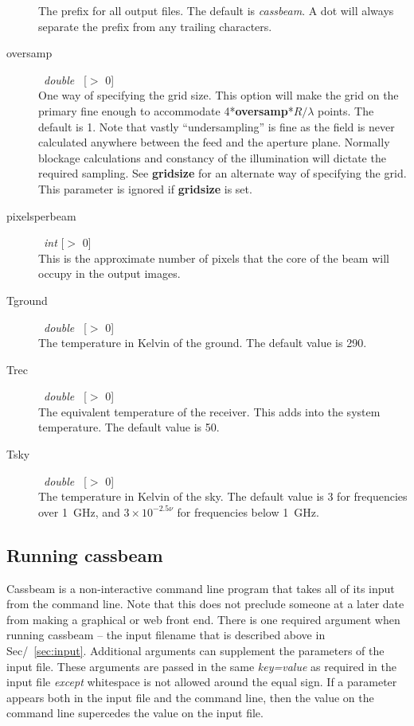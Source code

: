 \documentclass{article}
\begin{document}
\begin{description}
The prefix for all output files.  The default is {\it cassbeam}.  A dot
will always separate the prefix from any trailing characters.
\item[oversamp] \ {\it double} \ [$>$ 0] \\
One way of specifying the grid size.  This option will make the grid on the
primary fine enough to accommodate 4*{\bf oversamp}*$R/\lambda$ points.  The
default is 1.  Note that vastly ``undersampling'' is fine as the field is
never calculated anywhere between the feed and the aperture plane.  Normally
blockage calculations and constancy of the illumination will dictate the
required sampling.  See {\bf gridsize} for an alternate way of specifying
the grid.  This parameter is ignored if {\bf gridsize} is set.
\item[pixelsperbeam] \ {\it int} [$>$ 0] \\
This is the approximate number of pixels that the core of the beam will
occupy in the output images.
\item[Tground] \ {\it double} \ [$>$ 0] \\
The temperature in Kelvin of the ground.  The default value is 290.
\item[Trec] \ {\it double} \ [$>$ 0] \\
The equivalent temperature of the receiver.  This adds into the system
temperature.  The default value is 50.
\item[Tsky] \ {\it double} \ [$>$ 0] \\
The temperature in Kelvin of the sky.  The default value is 3 for frequencies
over 1~GHz, and $3 \times 10^{-2.5 \nu}$ for frequencies below 1~GHz.
\end{description}

\subsection{Running cassbeam}

Cassbeam is a non-interactive command line program that takes all of its input
from the command line.  Note that this does not preclude someone at a later
date from making a graphical or web front end.  There is one required
argument when running cassbeam -- the input filename that is described
above in Sec/~\ref{sec:input}.  Additional arguments can supplement the
parameters of the input file.  These arguments are passed in the 
same {\it key=value} as required in the input file {\it except} whitespace
is not allowed around the equal sign.  If a parameter appears both
in the input file and the command line, then the value on the command line
supercedes the value on the input file.
\end{document}
